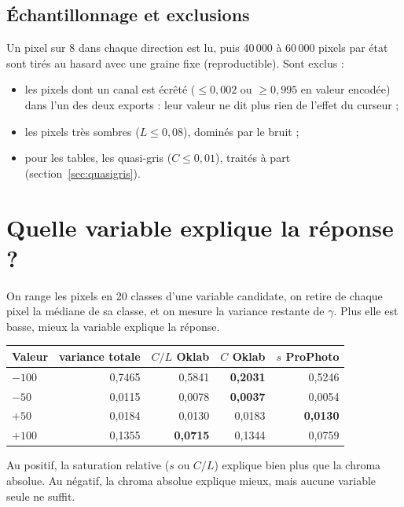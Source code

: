 \subsection{Échantillonnage et exclusions}
Un pixel sur 8 dans chaque direction est lu, puis 40\,000 à 60\,000 pixels par
état sont tirés au hasard avec une graine fixe (reproductible). Sont exclus :
\begin{itemize}
\item les pixels dont un canal est écrêté ($\le0{,}002$ ou $\ge0{,}995$ en
valeur encodée) dans l'un des deux exports : leur valeur ne dit plus rien de
l'effet du curseur ;
\item les pixels très sombres ($L\le0{,}08$), dominés par le bruit ;
\item pour les tables, les quasi-gris ($C\le0{,}01$), traités à part
(section~\ref{sec:quasigris}).
\end{itemize}


\section{Quelle variable explique la réponse ?}
On range les pixels en 20 classes d'une variable candidate, on retire de
chaque pixel la médiane de sa classe, et on mesure la variance restante de
$\gamma$. Plus elle est basse, mieux la variable explique la réponse.

\begin{center}
\begin{tabular}{lrrrr}
\toprule
Valeur & variance totale & $C/L$ Oklab & $C$ Oklab & $s$ ProPhoto\\
\midrule
$-100$ & 0,7465 & 0,5841 & \textbf{0,2031} & 0,5246\\
$-50$ & 0,0115 & 0,0078 & \textbf{0,0037} & 0,0054\\
$+50$ & 0,0184 & 0,0130 & 0,0183 & \textbf{0,0130}\\
$+100$ & 0,1355 & \textbf{0,0715} & 0,1344 & 0,0759\\
\bottomrule
\end{tabular}
\end{center}

Au positif, la saturation relative ($s$ ou $C/L$) explique bien plus que la
chroma absolue. Au négatif, la chroma absolue explique mieux, mais aucune
variable seule ne suffit.

